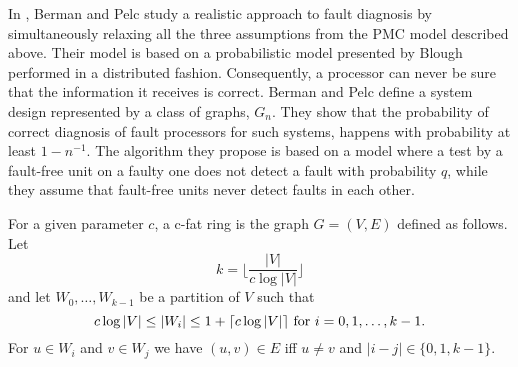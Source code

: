 In \cite{Ber}, Berman and Pelc study a
realistic approach to fault diagnosis by simultaneously relaxing all
the three assumptions from the PMC model described above. Their model
is based on a probabilistic model presented by Blough performed in a
distributed fashion. Consequently, a processor can never be sure that
the information it receives is correct. Berman and Pelc define a
system design represented by a class of graphs, $G_{n}$. They show that the
probability of correct diagnosis of fault processors for such systems, happens
with probability at least $1-n^{-1}$. The algorithm they propose is based on a
model where a test by a fault-free unit on a faulty one does not detect a fault
with probability $q$, while they assume that fault-free units never detect
faults in each other.

For a given parameter $c$, a c-fat ring is the graph $G=(V,E)$ defined as
follows. Let
\begin{displaymath}
k = \lfloor \frac{|V|}{c\log |V|} \rfloor
\end{displaymath}
and let
$W_{0},\ldots,W_{k-1}$ be a partition of $V$ such that
\begin{equation}
\label{eq:card}
c\log |V| \leq |W_{i}| \leq 1+ \lceil c\log |V| \rceil\
{\rm for}\ i= 0,1,\ldots,k-1. 
\end{equation}
For $u \in W_{i}$ and $v \in W_{j}$ we have $(u,v) \in E$ iff $u \neq v$
and $|i-j| \in \{0,1,k-1\}$.

